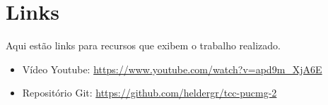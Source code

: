 \section{Links}

Aqui estão links para recursos que exibem o trabalho realizado.

\begin{itemize}
    \item Vídeo Youtube: \url{https://www.youtube.com/watch?v=apd9m_XjA6E}
    \item Repositório Git: \url{https://github.com/heldergr/tcc-pucmg-2}
\end{itemize}